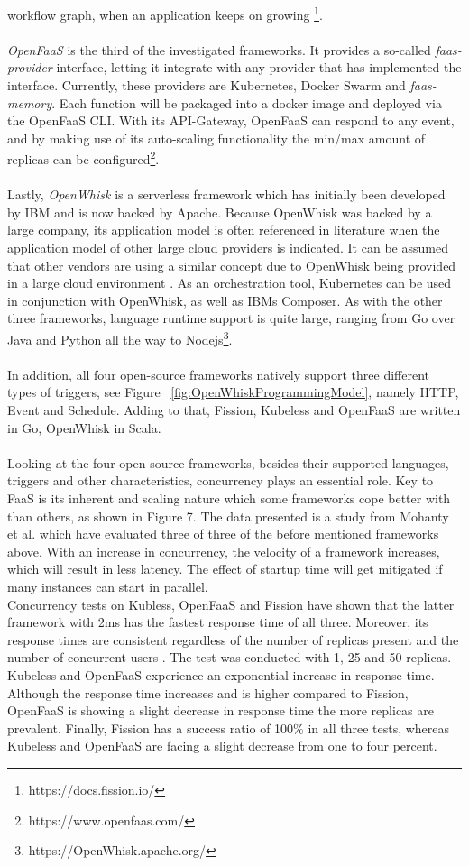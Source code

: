 \documentclass[a4paper,twoside,11pt, pagesize]{scrartcl}
\begin{document}
\begin{spacing}{1.2}
workflow graph, when an application keeps on growing \footnote{https://docs.fission.io/}.\\\\ \textit{OpenFaaS} is the third of the investigated frameworks. It provides a so-called \textit{faas-provider} interface, letting it integrate with any provider that has implemented the interface. Currently, these providers are Kubernetes, Docker Swarm and \textit{faas-memory}. Each function will be packaged into a docker image and deployed via the OpenFaaS CLI. With its API-Gateway, OpenFaaS can respond to any event, and by making use of its auto-scaling functionality the min/max amount of replicas can be configured\footnote{https://www.openfaas.com/}.\\\\ Lastly, \textit{OpenWhisk} is a serverless framework which has initially been developed by IBM and is now backed by Apache. Because OpenWhisk was backed by a large company, its application model is often referenced in literature when the application model of other large cloud providers is indicated. It can be assumed that other vendors are using a similar concept due to OpenWhisk being provided in a large cloud environment \cite{van2019spec}. As an orchestration tool, Kubernetes can be used in conjunction with OpenWhisk, as well as IBMs Composer. As with the other three frameworks, language runtime support is quite large, ranging from Go over Java and Python all the way to Nodejs\footnote{https://OpenWhisk.apache.org/}.\\\\ In addition,  all four open-source frameworks natively support three different types of triggers, see Figure ~\ref{fig:OpenWhiskProgrammingModel}, namely HTTP, Event and Schedule. Adding to that, Fission, Kubeless and OpenFaaS are written in Go, OpenWhisk in Scala.\\\\Looking at the four open-source frameworks, besides their supported languages, triggers and other characteristics, concurrency plays an essential role. Key to FaaS is its inherent and scaling nature which some frameworks cope better with than others, as shown in Figure 7. The data presented is a study from Mohanty et al. which have evaluated three of three of the before mentioned frameworks above. With an increase in concurrency, the velocity of a framework increases, which will result in less latency. The effect of startup time will get mitigated if many instances can start in parallel.\\Concurrency tests on Kubless, OpenFaaS and Fission have shown that the latter framework with 2ms has the fastest response time of all three. Moreover, its response times are consistent regardless of the number of replicas present and the number of concurrent users \cite{mohanty2018evaluation}. The test was conducted with 1, 25 and 50 replicas. Kubeless and OpenFaaS experience an exponential increase in response time. Although the response time increases and is higher compared to Fission, OpenFaaS is showing a slight decrease in response time the more replicas are prevalent. Finally, Fission has a success ratio of 100\% in all three tests, whereas Kubeless and OpenFaaS are facing a slight decrease from one to four percent.

\end{spacing}
\end{document}
